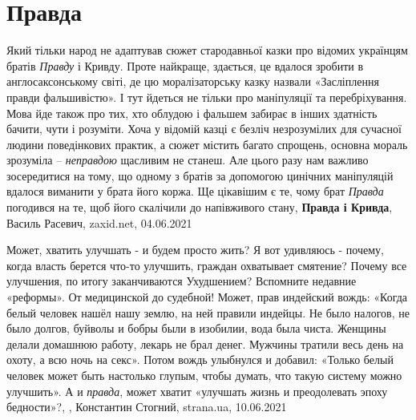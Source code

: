  
 
 
 
 
\chapter{Правда}

Який тільки народ не адаптував сюжет стародавньої казки про відомих українцям
братів \emph{Правду} і Кривду. Проте найкраще, здається, це вдалося зробити в
англосаксонському світі, де цю моралізаторську казку назвали «Засліплення
правди фальшивістю». І тут йдеться не тільки про маніпуляції та перебріхування.
Мова йде також про тих, хто облудою і фальшем забирає в інших здатність бачити,
чути і розуміти. Хоча у відомій казці є безліч незрозумілих для сучасної людини
поведінкових практик, а сюжет містить багато спрощень, основна мораль зрозуміла
– \emph{неправдою} щасливим не станеш. Але цього разу нам важливо зосередитися на
тому, що одному з братів за допомогою цинічних маніпуляцій вдалося виманити у
брата його коржа. Ще цікавішим є те, чому брат \emph{Правда} погодився на те, щоб його
скалічили до напівживого стану,
\textbf{Правда і Кривда}, Василь Расевич, zaxid.net, 04.06.2021

Может, хватить улучшать - и будем просто жить?  Я вот удивляюсь - почему, когда
власть берется что-то улучшить, граждан охватывает смятение? Почему все
улучшения, по итогу заканчиваются Ухудшением? Вспомните недавние «реформы». От
медицинской до судебной!  Может, прав индейский вождь: «Когда белый человек
нашёл нашу землю, на ней правили индейцы. Не было налогов, не было долгов,
буйволы и бобры были в изобилии, вода была чиста. Женщины делали домашнюю
работу, лекарь не брал денег. Мужчины тратили весь день на охоту, а всю ночь на
секс». Потом вождь улыбнулся и добавил: «Только белый человек может быть
настолько глупым, чтобы думать, что такую систему можно улучшить».  А и
\emph{правда}, может хватит «улучшать жизнь и преодолевать эпоху бедности»?,
, Константин Стогний, strana.ua, 10.06.2021

